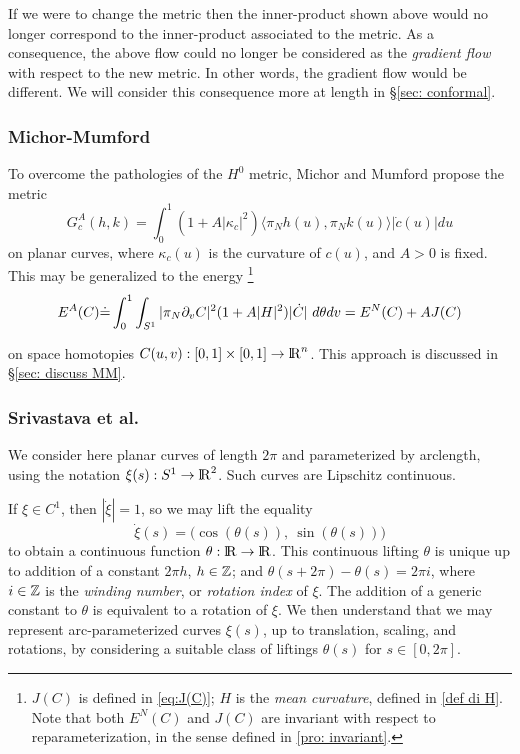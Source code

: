 \documentclass[twoside,a4paper,english]{article}
\def\derpar#1{\partial_{#1}}
\begin{document}
If we were to change the metric then the inner-product shown
above would no longer correspond to the inner-product associated to
the metric. As a consequence, the above flow could no longer be
considered as the {\em gradient flow} with respect to the new metric.
In other words, the gradient flow would be different. We will consider
this consequence more at length in \S \ref{sec: conformal}.






\subsubsection{Michor-Mumford}
\label{sec:Michor-Mumford}
To overcome the pathologies of the $H^0$ metric,
Michor and Mumford \cite{Michor-Mumford} propose the metric
\begin{equation}
  G^A_c(h,k) = \int_0^1 (1+A|\kappa_c|^2)
\langle\pi_N h(u),\pi_N k(u)\rangle 
|\dot c(u) |du \label{eq:G MM}
\end{equation}
on planar curves,
where $\kappa_c(u)$ is the curvature of $c(u)$, and $A>0$ is fixed.
This may be generalized to  the energy%
\footnote{$J(C)$ is defined in \eqref{eq:J(C)};
  $H$ is the \emph{mean curvature}, defined in \ref{def di H}.
  Note that both $E^N(C)$ and $J(C)$ are invariant with respect to
  reparameterization, in the sense defined in \vref{pro: invariant}.
}
\begin{equation}\label{eq: E da MM}
  E^A(C)\defeq \int_0^1 \int_{S^1}
  |\pi_N\derpar v C| ^2 (1+A | H | ^2) |\overdot C|~d\theta dv
  =E^N(C) + A J(C)
\end{equation}

on space homotopies $C(u,v):[0,1]\times[0,1]\to{\protect\mathrm{l\hskip-0.15em R}}^n$. 
This approach is discussed in \S\ref{sec: discuss MM}.

\subsubsection{Srivastava et al.}
\label{SEC:SRIV}

We consider here planar curves of length $2\pi$ and parameterized by arclength,
using the notation $\xi(s):S^1\to{\protect\mathrm{l\hskip-0.15em R}}^2$. Such curves are 
Lipschitz continuous.

If $\xi\in C^1$,  then $|\dot\xi|=1$, so we may lift the equality
\begin{equation}
  \dot \xi(s) = \big(\!\cos(\theta(s)),~\sin(\theta(s))\big) \label{eq:lifting}
\end{equation}
to obtain a continuous function $\theta:{\protect\mathrm{l\hskip-0.15em R}}\to{\protect\mathrm{l\hskip-0.15em R}}$. 
This continuous lifting $\theta$ is unique up to addition of
a constant $2\pi h$, $h\in{\protect\mathbb{Z}}$; and 
$\theta(s+ 2\pi) - \theta(s) = 2\pi i$, where $i\in{\protect\mathbb{Z}}$ is the
\emph{winding number}, or \emph{rotation index} of $\xi$.
The addition of a generic constant to $\theta$ is equivalent to
a rotation of $\xi$.
We then understand that we may represent arc-parameterized curves $\xi(s)$,
up to translation, scaling, and rotations, by 
considering a suitable class of liftings $\theta(s)$ for $s\in[0,2\pi]$.
\end{document}
